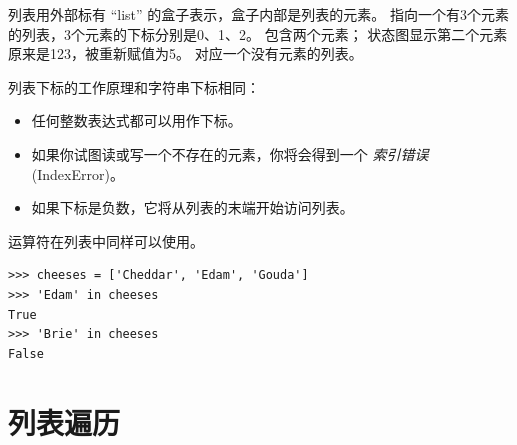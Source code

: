 列表用外部标有 ``list'' 的盒子表示，盒子内部是列表的元素。  指向一个有3个元素的列表，3个元素的下标分别是0、1、2。  包含两个元素；
状态图显示第二个元素原来是123，被重新赋值为5。  对应一个没有元素的列表。


列表下标的工作原理和字符串下标相同：


\begin{itemize}

\item 任何整数表达式都可以用作下标。

\item 如果你试图读或写一个不存在的元素，你将会得到一个 {\em 索引错误} (IndexError)。

\item 如果下标是负数，它将从列表的末端开始访问列表。

\end{itemize}
  
  


 运算符在列表中同样可以使用。

\begin{lstlisting}
>>> cheeses = ['Cheddar', 'Edam', 'Gouda']
>>> 'Edam' in cheeses
True
>>> 'Brie' in cheeses
False
\end{lstlisting}


\section{列表遍历}
  
  

